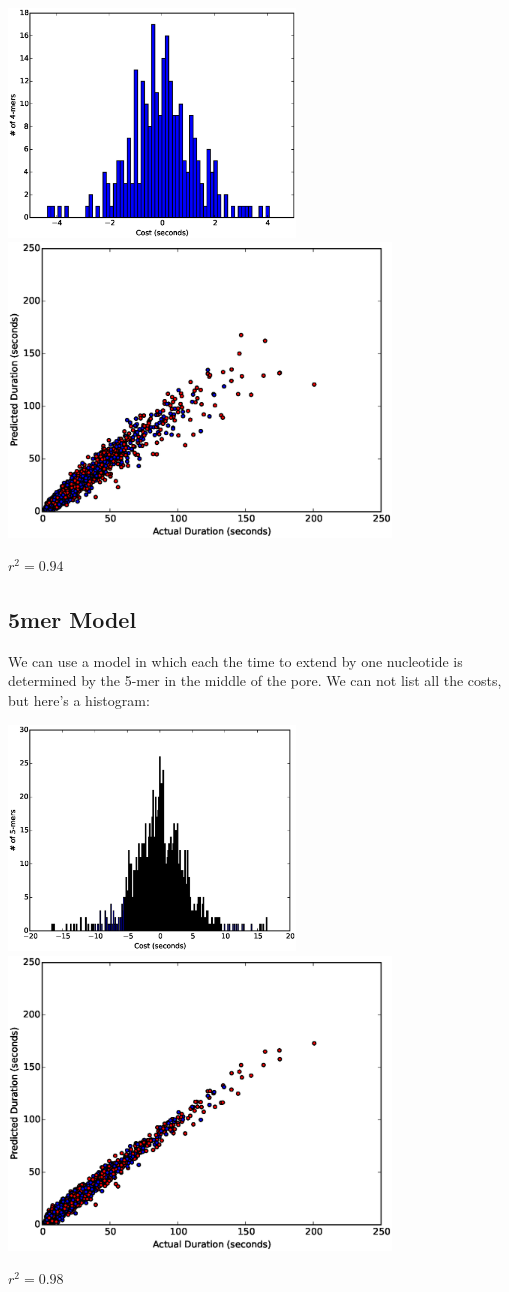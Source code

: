 \includegraphics[width=3in]{part11hist4}\\
\includegraphics[width=4in]{part11scatter4mer}

$r^2=0.94$

\subsection*{5mer Model}

        We can use a model in which each the time to extend by one nucleotide is determined by the 5-mer in the middle of the
        pore.  We can not list all the costs, but here's a histogram:
        
\includegraphics[width=3in]{part11hist5}\\
\includegraphics[width=4in]{part11scatter5mer}

$r^2=0.98$

